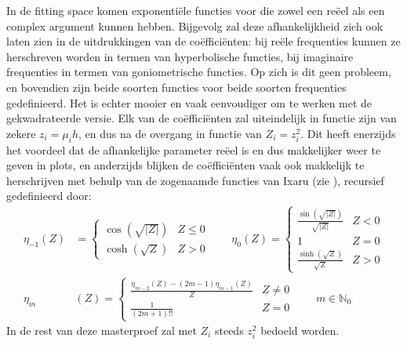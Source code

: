 \documentclass[12pt]{article}
\begin{document}
In de fitting space komen exponentiële functies voor die zowel een reëel als een complex argument kunnen hebben. Bijgevolg zal deze afhankelijkheid zich ook laten zien in de uitdrukkingen van de coëfficiënten: bij reële frequenties kunnen ze herschreven worden in termen van hyperbolische functies, bij imaginaire frequenties in termen van goniometrische functies. Op zich is dit geen probleem, en bovendien zijn beide soorten functies voor beide soorten frequenties gedefinieerd. Het is echter mooier en vaak eenvoudiger om te werken met de gekwadrateerde versie. Elk van de coëfficiënten zal uiteindelijk in functie zijn van zekere \(z_i=\mu_ih\), en dus na de overgang in functie van \(Z_i=z_i^2\). Dit heeft enerzijds het voordeel dat de afhankelijke parameter reëel is en dus makkelijker weer te geven in plots, en anderzijds blijken de coëfficiënten vaak ook makkelijk te herschrijven met behulp van de zogenaamde functies van Ixaru (zie \cite{ixarufun}), recursief gedefinieerd door:
\begin{equation}
\begin{split}
    \eta_{-1}(Z)&=\begin{cases}\cos(\sqrt{|Z|}) & Z\le0 \\ \cosh(\sqrt{Z}) & Z>0\end{cases}\qquad \eta_0(Z)=\begin{cases}\frac{\sin(\sqrt{|Z|})}{\sqrt{|Z|}} & Z<0 \\ 1&Z=0 \\ \frac{\sinh(\sqrt{Z})}{\sqrt{Z}} & Z>0\end{cases} \\
    \eta_m&(Z)=\begin{cases}\frac{\eta_{m-2}(Z)-(2m-1)\eta_{m-1}(Z)}{Z}&Z\ne0 \\ \frac{1}{(2m+1)!!}&Z=0\end{cases}\qquad m\in\mathbb{N}_0
\end{split}
\end{equation}
In de rest van deze masterproef zal met \(Z_i\) steeds \(z_i^2\) bedoeld worden.
\end{document}
